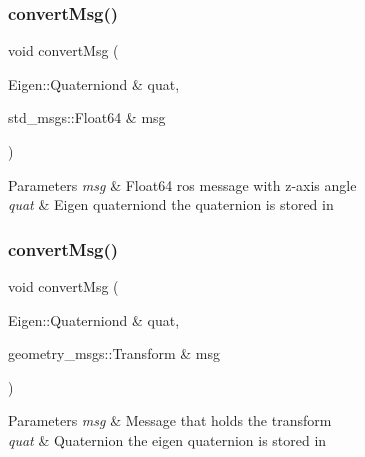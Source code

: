 \subsubsection{\texorpdfstring{convert\+Msg()}{convertMsg()}\hspace{0.1cm}{\footnotesize\ttfamily [1/14]}}
{\footnotesize\ttfamily void convert\+Msg (\begin{DoxyParamCaption}\item[{Eigen\+::\+Quaterniond \&}]{quat,  }\item[{std\+\_\+msgs\+::\+Float64 \&}]{msg }\end{DoxyParamCaption})\hspace{0.3cm}{\ttfamily [inline]}}


\begin{DoxyParams}{Parameters}
{\em msg} & Float64 ros message with z-\/axis angle \\
\hline
{\em quat} & Eigen quaterniond the quaternion is stored in \\
\hline
\end{DoxyParams}
\mbox{\label{group__MultiRobotController_gad42169e0be94216cd31a8a360a848155}} 
\subsubsection{\texorpdfstring{convert\+Msg()}{convertMsg()}\hspace{0.1cm}{\footnotesize\ttfamily [2/14]}}
{\footnotesize\ttfamily void convert\+Msg (\begin{DoxyParamCaption}\item[{Eigen\+::\+Quaterniond \&}]{quat,  }\item[{geometry\+\_\+msgs\+::\+Transform \&}]{msg }\end{DoxyParamCaption})\hspace{0.3cm}{\ttfamily [inline]}}


\begin{DoxyParams}{Parameters}
{\em msg} & Message that holds the transform \\
\hline
{\em quat} & Quaternion the eigen quaternion is stored in \\
\hline
\end{DoxyParams}
\mbox{\label{group__MultiRobotController_ga34987bf2293cc8aa5fac7ac60e6510ef}} 
